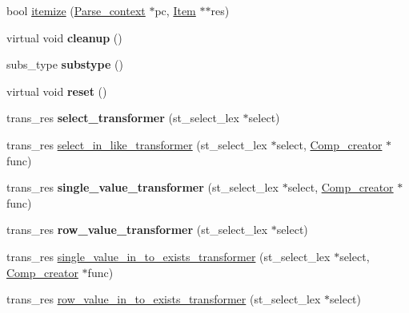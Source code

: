 \begin{DoxyCompactItemize}
\item 
bool \mbox{\hyperlink{classItem__in__subselect_a68b1a8d10b94a1e2ff4afddc6eff2d58}{itemize}} (\mbox{\hyperlink{structParse__context}{Parse\+\_\+context}} $\ast$pc, \mbox{\hyperlink{classItem}{Item}} $\ast$$\ast$res)
\item 
\mbox{\label{classItem__in__subselect_ae2bba75a7f481132e7a57563159f80c2}} 
virtual void {\bfseries cleanup} ()
\item 
\mbox{\label{classItem__in__subselect_ae70d9ce5b2f4ddf56264597d9e047e33}} 
subs\+\_\+type {\bfseries substype} ()
\item 
\mbox{\label{classItem__in__subselect_affae4ed8436a52d70fcf0cd0b23f28b4}} 
virtual void {\bfseries reset} ()
\item 
\mbox{\label{classItem__in__subselect_a7e532781a5f30fa4dd4a8508afec3728}} 
trans\+\_\+res {\bfseries select\+\_\+transformer} (st\+\_\+select\+\_\+lex $\ast$select)
\item 
trans\+\_\+res \mbox{\hyperlink{classItem__in__subselect_a31a5c942e77c98083c9b9077c51ff3f8}{select\+\_\+in\+\_\+like\+\_\+transformer}} (st\+\_\+select\+\_\+lex $\ast$select, \mbox{\hyperlink{classComp__creator}{Comp\+\_\+creator}} $\ast$func)
\item 
\mbox{\label{classItem__in__subselect_a57fbfac8e6287d78884f61ff0b9ac0cd}} 
trans\+\_\+res {\bfseries single\+\_\+value\+\_\+transformer} (st\+\_\+select\+\_\+lex $\ast$select, \mbox{\hyperlink{classComp__creator}{Comp\+\_\+creator}} $\ast$func)
\item 
\mbox{\label{classItem__in__subselect_a94bccfd98a5de4eae5a8dcfcaba3533c}} 
trans\+\_\+res {\bfseries row\+\_\+value\+\_\+transformer} (st\+\_\+select\+\_\+lex $\ast$select)
\item 
trans\+\_\+res \mbox{\hyperlink{classItem__in__subselect_ae61f900450b8847fb0cec6f79eed42fb}{single\+\_\+value\+\_\+in\+\_\+to\+\_\+exists\+\_\+transformer}} (st\+\_\+select\+\_\+lex $\ast$select, \mbox{\hyperlink{classComp__creator}{Comp\+\_\+creator}} $\ast$func)
\item 
trans\+\_\+res \mbox{\hyperlink{classItem__in__subselect_a6f5b5e6374b290d5efd086002d91ff92}{row\+\_\+value\+\_\+in\+\_\+to\+\_\+exists\+\_\+transformer}} (st\+\_\+select\+\_\+lex $\ast$select)
$$
\end{DoxyCompactItemize}

